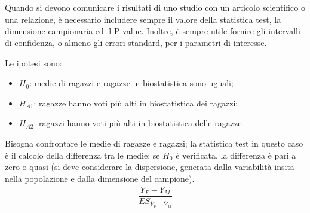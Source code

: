 \documentclass[10pt, draft]{book}
\newcommand{\tightlist}{%
\setlength{\itemsep}{1pt}\setlength{\parskip}{0pt}\setlength{\parsep}{0pt}}
\newcounter{example}[section]
\begin{document}
\\
\\
Quando si devono comunicare i risultati di uno studio con un articolo scientifico o una relazione, è necessario includere sempre il valore della statistica test, la dimensione campionaria ed il P-value. Inoltre, è sempre utile fornire gli intervalli di confidenza, o almeno gli errori standard, per i parametri di interesse.
\begin{example}\label{esvoti}
    Le ipotesi sono:
    \begin{itemize} \tightlist
        \item $H_0$: medie di ragazzi e ragazze in biostatistica sono uguali;
        \item $H_{A1}$: ragazze hanno voti più alti in biostatistica dei ragazzi;
        \item $H_{A2}$: ragazzi hanno voti più alti in biostatistica delle ragazze.
    \end{itemize}
    Bisogna confrontare le medie di ragazze e ragazzi; la statistica test in questo caso è il calcolo della differenza tra le medie: se $H_0$ è verificata, la differenza è pari a zero o quasi (si deve considerare la dispersione, generata dalla variabilità insita nella popolazione e dalla dimensione del campione).
    \begin{equation}
        \frac{\overline{Y}_F-\overline{Y}_M}{ES_{\overline{Y}_F-\overline{Y}_M}}
    \end{equation}
\end{example}
\end{document}

